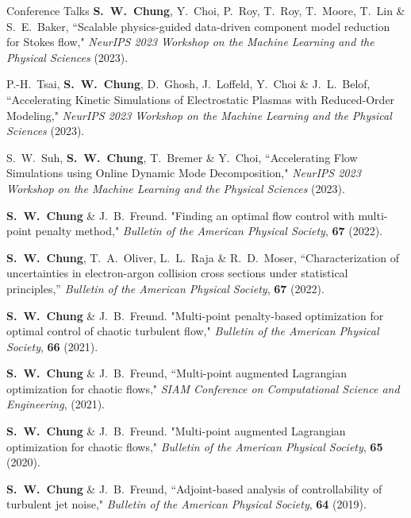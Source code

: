 \documentclass{resume} %
\begin{document}
\begin{rSection}{Conference Talks}
\textbf{S.\ W.\ Chung}, Y.\ Choi, P.\ Roy, T.\ Roy, T.\ Moore, T.\ Lin \& S.\ E.\ Baker,
``Scalable physics-guided data-driven component model reduction for Stokes flow,"
\textit{NeurIPS 2023 Workshop on the Machine Learning and the Physical Sciences} (2023).
\par
P.-H.\ Tsai, \textbf{S.\ W.\ Chung}, D.\ Ghosh, J.\ Loffeld, Y.\ Choi \& J.\ L.\ Belof,
``Accelerating Kinetic Simulations of Electrostatic Plasmas with Reduced-Order Modeling,"
\textit{NeurIPS 2023 Workshop on the Machine Learning and the Physical Sciences} (2023).
\par
S.\ W.\ Suh, \textbf{S.\ W.\ Chung}, T.\ Bremer \& Y.\ Choi,
``Accelerating Flow Simulations using Online Dynamic Mode Decomposition,"
\textit{NeurIPS 2023 Workshop on the Machine Learning and the Physical Sciences} (2023).
\par

\textbf{S.\ W.\ Chung} \& J.\ B.\ Freund. "Finding an optimal flow control with multi-point penalty method,"
\textit{Bulletin of the American Physical Society}, \textbf{67} (2022).

\par
\textbf{S.\ W.\ Chung}, T.\ A.\ Oliver, L.\ L.\ Raja \& R.\ D.\ Moser,  ``Characterization of uncertainties in electron-argon collision cross sections under statistical principles,''
\textit{Bulletin of the American Physical Society}, \textbf{67} (2022).

\par
\textbf{S.\ W.\ Chung} \& J.\ B.\ Freund. "Multi-point penalty-based optimization for optimal control of chaotic turbulent flow,"
\textit{Bulletin of the American Physical Society}, \textbf{66} (2021).

\par
\textbf{S.\ W.\ Chung} \& J.\ B.\ Freund, ``Multi-point augmented Lagrangian optimization for chaotic flows,"
\textit{SIAM Conference on Computational Science and Engineering}, (2021).

\par
\textbf{S.\ W.\ Chung} \& J.\ B.\ Freund. "Multi-point augmented Lagrangian optimization for chaotic flows,"
\textit{Bulletin of the American Physical Society}, \textbf{65} (2020).

\par
\textbf{S.\ W.\ Chung} \& J.\ B.\ Freund,
``Adjoint­-based analysis of controllability of turbulent jet noise,"
\textit{Bulletin of the American Physical Society}, \textbf{64} (2019).


\end{rSection}
\end{document}
